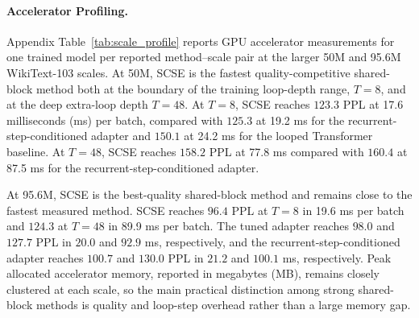 \documentclass[letterpaper]{article} %
\newcommand{\SCSE}{\textsc{SCSE}}
\theoremstyle{remark}
\begin{document}
\paragraph{Accelerator Profiling.} Appendix Table~\ref{tab:scale_profile} reports GPU accelerator measurements for one trained model per reported method--scale pair at the larger 50M and 95.6M WikiText-103 scales.  At 50M, \SCSE{} is the fastest quality-competitive shared-block method both at the boundary of the training loop-depth range, $T=8$, and at the deep extra-loop depth $T=48$.  At $T=8$, \SCSE{} reaches $123.3$ PPL at 17.6 milliseconds (ms) per batch, compared with $125.3$ at 19.2 ms for the recurrent-step-conditioned adapter and $150.1$ at 24.2 ms for the looped Transformer baseline.  At $T=48$, \SCSE{} reaches $158.2$ PPL at 77.8 ms compared with $160.4$ at 87.5 ms for the recurrent-step-conditioned adapter.

At 95.6M, \SCSE{} is the best-quality shared-block method and remains close to the fastest measured method.  \SCSE{} reaches $96.4$ PPL at $T=8$ in 19.6 ms per batch and $124.3$ at $T=48$ in 89.9 ms per batch.  The tuned adapter reaches $98.0$ and $127.7$ PPL in $20.0$ and $92.9$ ms, respectively, and the recurrent-step-conditioned adapter reaches $100.7$ and $130.0$ PPL in $21.2$ and $100.1$ ms, respectively.  Peak allocated accelerator memory, reported in megabytes (MB), remains closely clustered at each scale, so the main practical distinction among strong shared-block methods is quality and loop-step overhead rather than a large memory gap.
\end{document}
